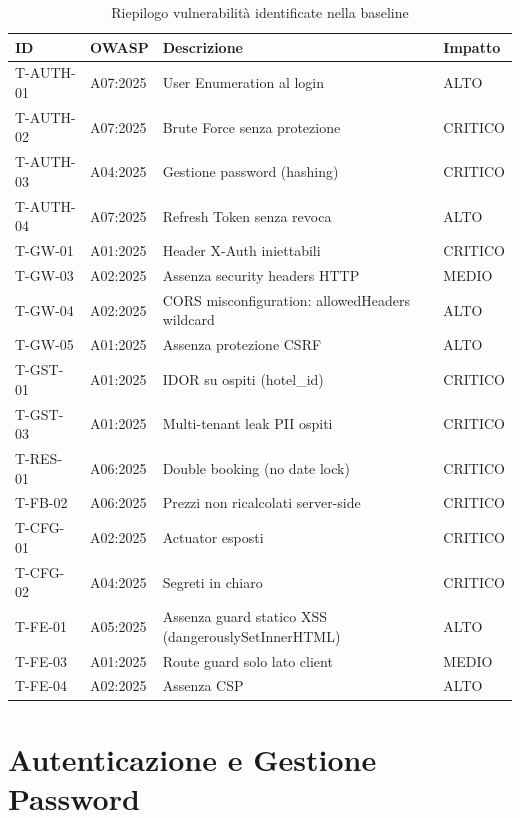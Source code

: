 ﻿\documentclass[a4paper,12pt]{report}
\begin{document}
\begin{table}[H]
\centering
\begin{tabularx}{\textwidth}{l l X l}
\toprule
\textbf{ID} & \textbf{OWASP} & \textbf{Descrizione} & \textbf{Impatto} \\
\midrule
T-AUTH-01 & A07:2025 & User Enumeration al login & ALTO \\
T-AUTH-02 & A07:2025 & Brute Force senza protezione & CRITICO \\
T-AUTH-03 & A04:2025 & Gestione password (hashing) & CRITICO \\
T-AUTH-04 & A07:2025 & Refresh Token senza revoca & ALTO \\
T-GW-01   & A01:2025 & Header X-Auth iniettabili & CRITICO \\
T-GW-03   & A02:2025 & Assenza security headers HTTP & MEDIO \\
T-GW-04   & A02:2025 & CORS misconfiguration: allowedHeaders wildcard & ALTO \\
T-GW-05   & A01:2025 & Assenza protezione CSRF & ALTO \\
T-GST-01  & A01:2025 & IDOR su ospiti (hotel\_id) & CRITICO \\
T-GST-03  & A01:2025 & Multi-tenant leak PII ospiti & CRITICO \\
T-RES-01  & A06:2025 & Double booking (no date lock) & CRITICO \\
T-FB-02   & A06:2025 & Prezzi non ricalcolati server-side & CRITICO \\
T-CFG-01  & A02:2025 & Actuator esposti & CRITICO \\
T-CFG-02  & A04:2025 & Segreti in chiaro & CRITICO \\
T-FE-01   & A05:2025 & Assenza guard statico XSS (dangerouslySetInnerHTML) & ALTO \\
T-FE-03   & A01:2025 & Route guard solo lato client & MEDIO \\
T-FE-04   & A02:2025 & Assenza CSP & ALTO \\
\bottomrule
\end{tabularx}
\caption{Riepilogo vulnerabilità identificate nella baseline}
\label{tab:vulns}
\end{table}

\section{Autenticazione e Gestione Password}
\end{document}
